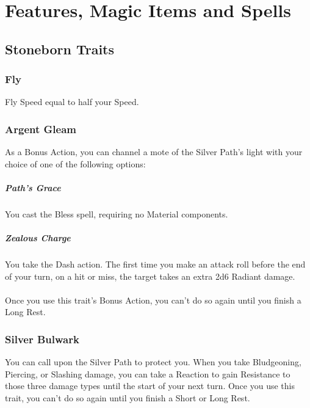 \documentclass[letterpaper,openany,oneside,twocolumn]{book}
\begin{document}
\onecolumn


\rendercharactersheet

\renderbackgroundsheet

\renderspellsheet


\restoregeometry
\twocolumn

\chapter*{Features, Magic Items and Spells}

\section*{Stoneborn Traits}
\subsection*{Fly}
Fly Speed equal to half your Speed.
\subsection*{Argent Gleam}
As a Bonus Action, you can channel a mote of the Silver Path's light with your choice of one of the following options:

\paragraph*{Path's Grace} You cast the Bless spell, requiring no Material components.

\paragraph*{Zealous Charge} You take the Dash action. The first time you make an attack roll before the end of your turn, on a hit or miss, the target takes an extra 2d6 Radiant damage.\\\\
Once you use this trait's Bonus Action, you can't do so again until you finish a Long Rest.
\subsection*{Silver Bulwark}
You can call upon the Silver Path to protect you. When you take Bludgeoning, Piercing, or Slashing damage, you can take a Reaction to gain Resistance to those three damage types until the start of your next turn. Once you use this trait, you can't do so again until you finish a Short or Long Rest.
\end{document}
